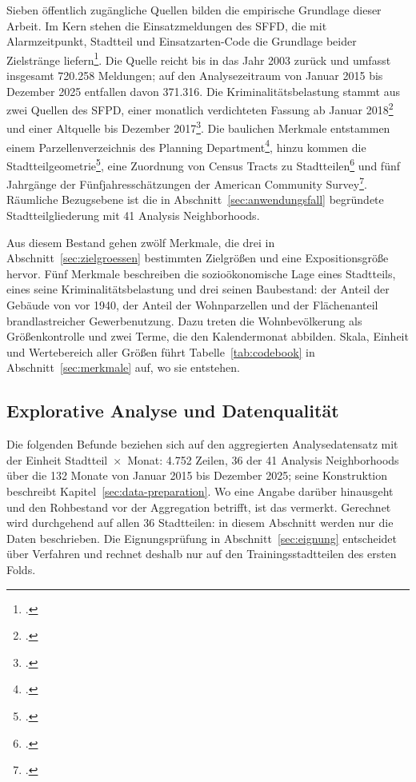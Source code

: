 \documentclass[12pt,a4paper]{article}
\begin{document}
Sieben öffentlich zugängliche Quellen bilden die empirische Grundlage dieser Arbeit. Im Kern stehen die Einsatzmeldungen des SFFD, die mit Alarmzeitpunkt, Stadtteil und Einsatzarten-Code die Grundlage beider Zielstränge liefern\footcite{SFFD2026}. Die Quelle reicht bis in das Jahr 2003 zurück und umfasst insgesamt 720.258 Meldungen; auf den Analysezeitraum von Januar 2015 bis Dezember 2025 entfallen davon 371.316. Die Kriminalitätsbelastung stammt aus zwei Quellen des SFPD, einer monatlich verdichteten Fassung ab Januar 2018\footcite{SFPD2026} und einer Altquelle bis Dezember 2017\footcite{SFPD2018}. Die baulichen Merkmale entstammen einem Parzellenverzeichnis des Planning Department\footcite{SFPlanning2020}, hinzu kommen die Stadtteilgeometrie\footcite{SFPlanning2023}, eine Zuordnung von Census Tracts zu Stadtteilen\footcite{SFPlanning2022} und fünf Jahrgänge der Fünfjahresschätzungen der American Community Survey\footcite{CensusACS2023}. Räumliche Bezugsebene ist die in Abschnitt~\ref{sec:anwendungsfall} begründete Stadtteilgliederung mit 41 Analysis Neighborhoods.

Aus diesem Bestand gehen zwölf Merkmale, die drei in Abschnitt~\ref{sec:zielgroessen} bestimmten Zielgrößen und eine Expositionsgröße hervor. Fünf Merkmale beschreiben die sozioökonomische Lage eines Stadtteils, eines seine Kriminalitätsbelastung und drei seinen Baubestand: der Anteil der Gebäude von vor 1940, der Anteil der Wohnparzellen und der Flächenanteil brandlastreicher Gewerbenutzung. Dazu treten die Wohnbevölkerung als Größenkontrolle und zwei Terme, die den Kalendermonat abbilden. Skala, Einheit und Wertebereich aller Größen führt Tabelle~\ref{tab:codebook} in Abschnitt~\ref{sec:merkmale} auf, wo sie entstehen.

\subsection{Explorative Analyse und Datenqualität}
\label{sec:eda}

Die folgenden Befunde beziehen sich auf den aggregierten Analysedatensatz mit der Einheit Stadtteil~×~Monat: 4.752 Zeilen, 36 der 41 Analysis Neighborhoods über die 132 Monate von Januar 2015 bis Dezember 2025; seine Konstruktion beschreibt Kapitel~\ref{sec:data-preparation}. Wo eine Angabe darüber hinausgeht und den Rohbestand vor der Aggregation betrifft, ist das vermerkt. Gerechnet wird durchgehend auf allen 36 Stadtteilen: in diesem Abschnitt werden nur die Daten beschrieben. Die Eignungsprüfung in Abschnitt~\ref{sec:eignung} entscheidet über Verfahren und rechnet deshalb nur auf den Trainingsstadtteilen des ersten Folds.
\end{document}
